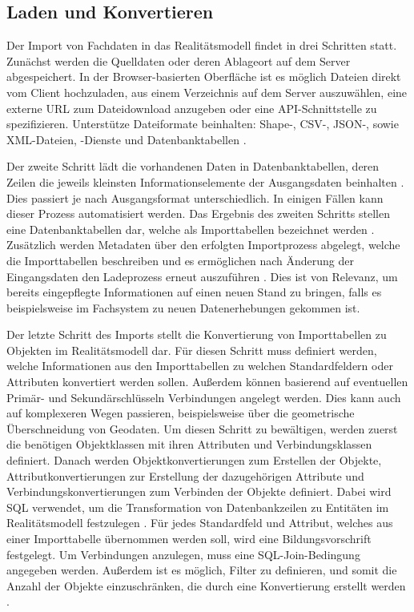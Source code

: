 \subsection{Laden und Konvertieren}
\label{sec:simplex-importer}

Der Import von Fachdaten in das Realitätsmodell findet in drei Schritten statt. Zunächst werden die Quelldaten oder deren Ablageort auf dem Server abgespeichert. In der Browser-basierten Oberfläche ist es möglich Dateien direkt vom Client hochzuladen, aus einem Verzeichnis auf dem Server auszuwählen, eine externe \acs{URL} zum Dateidownload anzugeben oder eine \acs{API}-Schnittstelle zu spezifizieren. Unterstütze Dateiformate beinhalten: Shape-, \acs{CSV}-, \acs{JSON}-, sowie \acs{XML}-Dateien, \ogcapi-Dienste und Datenbanktabellen \parencite{simplex4datagmbhSimplex4TwIS}.

Der zweite Schritt lädt die vorhandenen Daten in Datenbanktabellen, deren Zeilen die jeweils kleinsten Informationselemente der Ausgangsdaten beinhalten \parencite{grossmannFachsystemeSchemaevolution2024}. Dies passiert je nach Ausgangsformat unterschiedlich. In einigen Fällen kann dieser Prozess automatisiert werden. Das Ergebnis des zweiten Schritts stellen eine Datenbanktabellen dar, welche als Importtabellen bezeichnet werden . Zusätzlich werden Metadaten über den erfolgten Importprozess abgelegt, welche die Importtabellen beschreiben und es ermöglichen nach Änderung der Eingangsdaten den Ladeprozess erneut auszuführen \parencite{grossmannFachsystemeSchemaevolution2024}. Dies ist von Relevanz, um bereits eingepflegte Informationen auf einen neuen Stand zu bringen, falls es beispielsweise im Fachsystem zu neuen Datenerhebungen gekommen ist.

Der letzte Schritt des Imports stellt die Konvertierung von Importtabellen zu Objekten im Realitätsmodell dar. Für diesen Schritt muss definiert werden, welche Informationen aus den Importtabellen zu welchen Standardfeldern oder Attributen konvertiert werden sollen. Außerdem können basierend auf eventuellen Primär- und Sekundärschlüsseln Verbindungen angelegt werden. Dies kann auch auf komplexeren Wegen passieren, beispielsweise über die geometrische Überschneidung von Geodaten. Um diesen Schritt zu bewältigen, werden zuerst die benötigen Objektklassen mit ihren Attributen und Verbindungsklassen definiert. Danach werden Objektkonvertierungen zum Erstellen der Objekte, Attributkonvertierungen zur Erstellung der dazugehörigen Attribute und Verbindungskonvertierungen zum Verbinden der Objekte definiert. Dabei wird \acs{SQL} verwendet, um die Transformation von Datenbankzeilen zu Entitäten im Realitätsmodell festzulegen \parencite{grossmannFachsystemeSchemaevolution2024}. Für jedes Standardfeld und Attribut, welches aus einer Importtabelle übernommen werden soll, wird eine Bildungsvorschrift festgelegt. Um Verbindungen anzulegen, muss eine \acs{SQL}-Join-Bedingung angegeben werden. Außerdem ist es möglich, Filter zu definieren, und somit die Anzahl der Objekte einzuschränken, die durch eine Konvertierung erstellt werden \parencite{grossmannFachsystemeSchemaevolution2024}.

